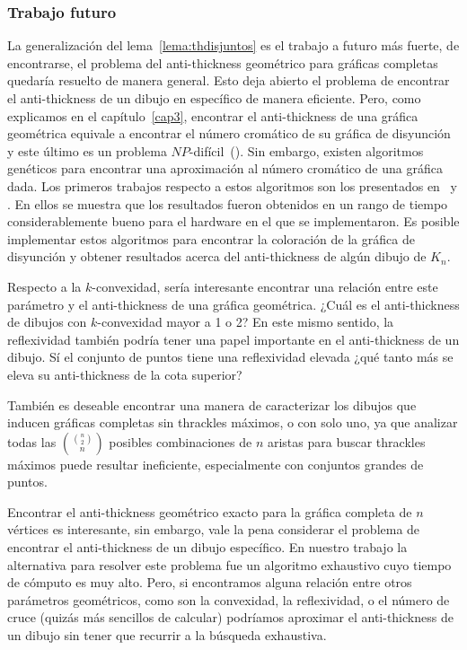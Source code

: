 \subsubsection{Trabajo futuro}

La generalización del lema~\ref{lema:thdisjuntos} es el trabajo a futuro más fuerte, de encontrarse, el
problema del anti-thickness geométrico para gráficas completas quedaría resuelto de manera general. Esto
deja abierto el problema de encontrar el anti-thickness de un dibujo en específico de manera eficiente.
Pero, como explicamos en el capítulo~\ref{cap3}, encontrar el anti-thickness de una gráfica geométrica
equivale a encontrar el número cromático de su gráfica de disyunción y este último es un problema
$NP$-difícil~(\cite{Skiena2003}). Sin embargo, existen algoritmos genéticos para encontrar una aproximación
al número cromático de una gráfica dada. Los primeros trabajos respecto a estos algoritmos son los
presentados en~\cite{Fleurent1996} y \cite{Galinier1999}. En ellos se muestra que los resultados fueron
obtenidos en un rango de tiempo considerablemente bueno para el hardware en el que se implementaron. Es
posible implementar estos algoritmos para encontrar la coloración de la gráfica de disyunción y obtener
resultados acerca del anti-thickness de algún dibujo de $K_n$.

Respecto a la $k$-convexidad, sería interesante encontrar una relación entre este parámetro y el
anti-thickness de una gráfica geométrica. ¿Cuál es el anti-thickness de dibujos con $k$-convexidad mayor a
1 o 2? En este mismo sentido, la reflexividad también podría tener una papel importante en el
anti-thickness de un dibujo. Sí el conjunto de puntos tiene una reflexividad elevada ¿qué tanto más se
eleva su anti-thickness de la cota superior?

También es deseable encontrar una manera de caracterizar los dibujos que inducen gráficas completas sin
thrackles máximos, o con solo uno, ya que analizar todas las $\displaystyle \binom{\binom{n}{2}}{n}$
posibles combinaciones de $n$ aristas para buscar thrackles máximos puede resultar ineficiente,
especialmente con conjuntos grandes de puntos.

Encontrar el anti-thickness geométrico exacto para la gráfica completa de $n$ vértices es interesante, sin
embargo, vale la pena considerar el problema de encontrar el anti-thickness de un dibujo específico. En
nuestro trabajo la alternativa para resolver este problema fue un algoritmo exhaustivo cuyo tiempo de
cómputo es muy alto. Pero, si encontramos alguna relación entre otros parámetros geométricos, como
son la convexidad, la reflexividad, o el número de cruce (quizás más sencillos de calcular) podríamos
aproximar el anti-thickness de un dibujo sin tener que recurrir a la búsqueda exhaustiva.
